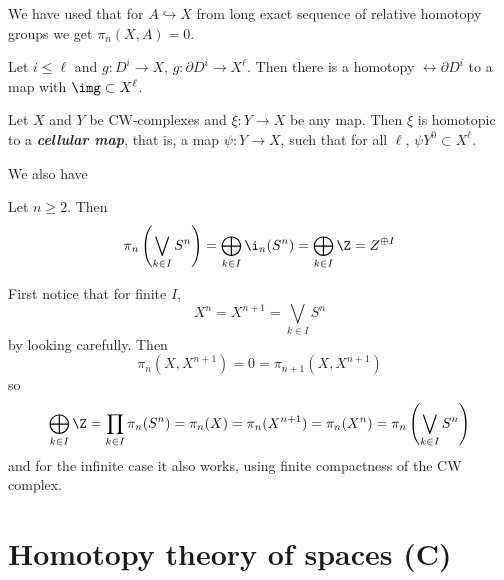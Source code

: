 \begin{remark}
\begin{remark}
	We have used that for $A\hookrightarrow X$ from long exact sequence of relative homotopy groups we get $\pi_n(X,A)=0$.
\end{remark}

\begin{coro}
	Let $i\leq \ell$ and $g: D^i\to X$, $g:\partial D^i\to X^\ell$. Then there is a homotopy $\rel\partial D^i$ to a map with $\img\subset X^\ell$.
\end{coro}

\begin{thm}
	Let $X$ and $Y$ be CW-complexes and $\xi:Y\to X$ be any map. Then $\xi$ is homotopic to a \textbf{\textit{cellular map}}, that is, a map $\psi:Y\to X$, such that for all $\ell$, $\psi Y^0\subset X^\ell$.
\end{thm}

We also have
\begin{prop}
	Let $n\geq 2$. Then 
	\[\pi_n\left(\bigvee_{k\in I}S^n\right)=\bigoplus_{k\in I}\i_n(S^n)=\bigoplus_{k\in I}\Z=Z^{\oplus I}\]
\end{prop}
\begin{prop}
	First notice that for finite $I$,
	\[X^n=X^{n+1}=\bigvee_{k\in I}S^n\]
	by looking carefully. Then
	\[\pi_n(X,X^{n+1})=0=\pi_{n+1}(X,X^{n+1})\]
	so
	\[\bigoplus_{k\in I}\Z=\prod_{k\in I}\pi_n(S^n)=\pi_n(X)=\pi_n(X^{n+1})=\pi_n(X^n)=\pi_n\left(\bigvee_{k\in I}S^n\right)\]
	and for the infinite case it also works, using finite compactness of the CW complex.
\end{prop}

\section{Homotopy theory of spaces (C)}


\end{remark}
